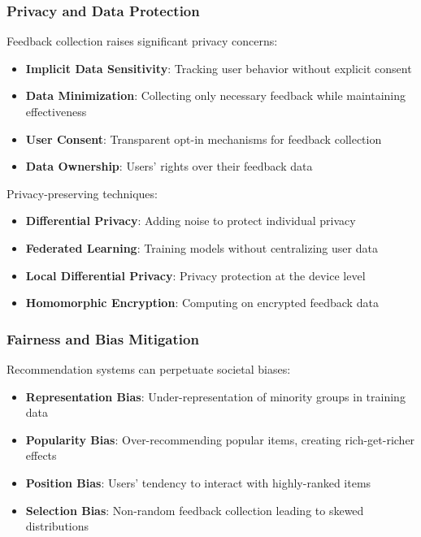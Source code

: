 \documentclass[acmsmall,review,anonymous]{acmart}
\begin{document}
\subsubsection{Privacy and Data Protection}

Feedback collection raises significant privacy concerns:

\begin{itemize}
    \item \textbf{Implicit Data Sensitivity}: Tracking user behavior without explicit consent
    \item \textbf{Data Minimization}: Collecting only necessary feedback while maintaining effectiveness
    \item \textbf{User Consent}: Transparent opt-in mechanisms for feedback collection
    \item \textbf{Data Ownership}: Users' rights over their feedback data
\end{itemize}

Privacy-preserving techniques:
\begin{itemize}
    \item \textbf{Differential Privacy}: Adding noise to protect individual privacy
    \item \textbf{Federated Learning}: Training models without centralizing user data
    \item \textbf{Local Differential Privacy}: Privacy protection at the device level
    \item \textbf{Homomorphic Encryption}: Computing on encrypted feedback data
\end{itemize}

\subsubsection{Fairness and Bias Mitigation}

Recommendation systems can perpetuate societal biases:

\begin{itemize}
    \item \textbf{Representation Bias}: Under-representation of minority groups in training data
    \item \textbf{Popularity Bias}: Over-recommending popular items, creating rich-get-richer effects
    \item \textbf{Position Bias}: Users' tendency to interact with highly-ranked items
    \item \textbf{Selection Bias}: Non-random feedback collection leading to skewed distributions
\end{itemize}
\end{document}
